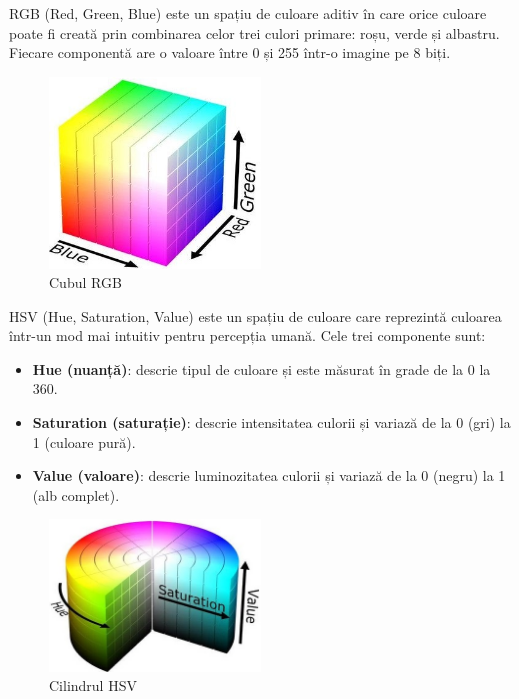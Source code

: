 \documentclass[a4paper,12pt]{report}
\begin{document}
RGB (Red, Green, Blue) este un spațiu de culoare aditiv în care orice culoare poate fi creată prin combinarea celor trei culori primare: roșu, verde și albastru. Fiecare componentă are o valoare între 0 și 255 într-o imagine pe 8 biți.

\begin{figure}[h!]
    \centering
    \includegraphics[width=0.5\textwidth]{images/RGB.jpg}
    \caption{Cubul RGB}
\end{figure}
\FloatBarrier

HSV (Hue, Saturation, Value) este un spațiu de culoare care reprezintă culoarea într-un mod mai intuitiv pentru percepția umană. Cele trei componente sunt:
\begin{itemize}
    \item \textbf{Hue (nuanță)}: descrie tipul de culoare și este măsurat în grade de la 0 la 360.
    \item \textbf{Saturation (saturație)}: descrie intensitatea culorii și variază de la 0 (gri) la 1 (culoare pură).
    \item \textbf{Value (valoare)}: descrie luminozitatea culorii și variază de la 0 (negru) la 1 (alb complet).
\end{itemize}

\begin{figure}[h!]
    \centering
    \includegraphics[width=0.5\textwidth]{images/HSV.jpg}
    \caption{Cilindrul HSV}
\end{figure}
\FloatBarrier
\end{document}
